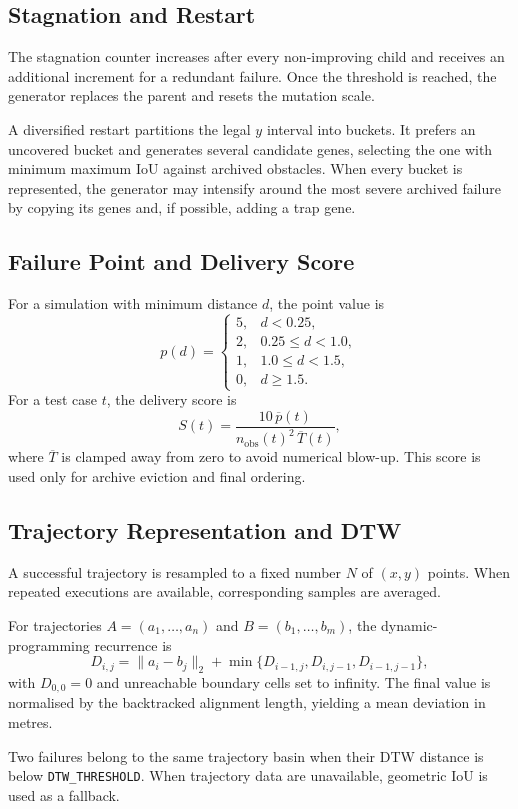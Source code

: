 \documentclass[11pt,a4paper]{report}
\newcommand{\code}[1]{\texttt{#1}}
\begin{document}
\subsection{Stagnation and Restart}
The stagnation counter increases after every non-improving child and receives an additional increment for a redundant failure. Once the threshold is reached, the generator replaces the parent and resets the mutation scale.

A diversified restart partitions the legal $y$ interval into buckets. It prefers an uncovered bucket and generates several candidate genes, selecting the one with minimum maximum IoU against archived obstacles. When every bucket is represented, the generator may intensify around the most severe archived failure by copying its genes and, if possible, adding a trap gene.

\subsection{Failure Point and Delivery Score}
For a simulation with minimum distance $d$, the point value is
\[
p(d)=
\begin{cases}
5, & d<0.25,\\
2, & 0.25\le d<1.0,\\
1, & 1.0\le d<1.5,\\
0, & d\ge 1.5.
\end{cases}
\]
For a test case $t$, the delivery score is
\[
S(t)=\frac{10\,\overline{p}(t)}{n_{\mathrm{obs}}(t)^2\,\overline{T}(t)},
\]
where $\overline{T}$ is clamped away from zero to avoid numerical blow-up. This score is used only for archive eviction and final ordering.

\subsection{Trajectory Representation and DTW}
A successful trajectory is resampled to a fixed number $N$ of $(x,y)$ points. When repeated executions are available, corresponding samples are averaged.

For trajectories $A=(a_1,\ldots,a_n)$ and $B=(b_1,\ldots,b_m)$, the dynamic-programming recurrence is
\[
D_{i,j}=\lVert a_i-b_j\rVert_2+
\min\{D_{i-1,j},D_{i,j-1},D_{i-1,j-1}\},
\]
with $D_{0,0}=0$ and unreachable boundary cells set to infinity. The final value is normalised by the backtracked alignment length, yielding a mean deviation in metres.

Two failures belong to the same trajectory basin when their DTW distance is below \code{DTW\_THRESHOLD}. When trajectory data are unavailable, geometric IoU is used as a fallback.
\end{document}
